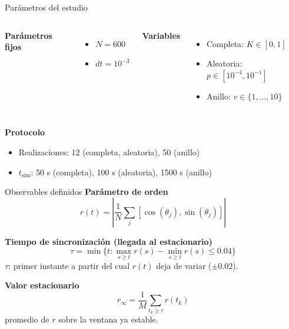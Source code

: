 \documentclass{beamer}
\begin{document}
\begin{frame}{Par\'ametros del estudio}
  \begin{columns}[T,onlytextwidth]
    \hspace{0.5cm}
    \small
    \textbf{Par\'ametros fijos}
    \begin{itemize}
      \item $N = 600$
      \item $dt = 10^{-3}$
    \end{itemize}

    \small
    \textbf{Variables}
    \begin{itemize}
      \item Completa: $K \in [0,1]$
      \item Aleatoria: $p \in [10^{-4},10^{-1}]$
      \item Anillo: $v \in \{1,\dots,10\}$
    \end{itemize}
  \end{columns}

  \vspace{0.35cm}
  \hspace{0.5cm}
  \small
  \textbf{Protocolo}
  \begin{itemize}
    \item Realizaciones: 12 (completa, aleatoria), 50 (anillo)
    \item $t_{\mathrm{sim}}$: 50 s (completa), 100 s (aleatoria), 1500 s (anillo)
  \end{itemize}
\end{frame}

\begin{frame}{Observables definidos}
  \small
  \textbf{Par\'ametro de orden}
  \begin{equation*}
    r(t) = \left| \frac{1}{N} \sum_j [\cos(\theta_j), \sin(\theta_j)] \right|
  \end{equation*}

  \textbf{Tiempo de sincronizaci\'on (llegada al estacionario)}
  \begin{equation*}
    \tau = \min\Big\{ t : \max_{s \ge t} r(s) - \min_{s \ge t} r(s) \le 0.04 \Big\}
  \end{equation*}
  {\footnotesize $\tau$: primer instante a partir del cual $r(t)$ deja de variar ($\pm 0.02$).}

  \vspace{0.4cm}

  \textbf{Valor estacionario}
  \begin{equation*}
    r_{\infty} = \frac{1}{M} \sum_{t_k \ge \tau} r(t_k)
  \end{equation*}
  {\footnotesize promedio de $r$ sobre la ventana ya estable.}
  
\end{frame}
\end{document}
